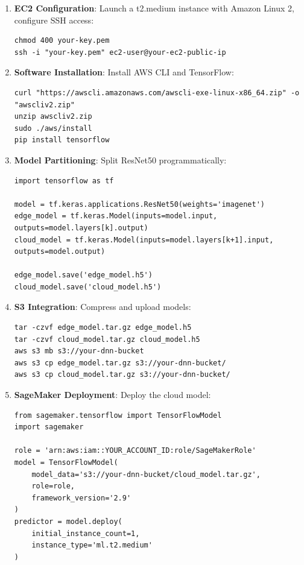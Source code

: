 \documentclass[conference]{IEEEtran}
\begin{document}
\begin{enumerate}
  \item \textbf{EC2 Configuration}: Launch a t2.medium instance with Amazon Linux 2, configure SSH access:
  \begin{lstlisting}[style=bash]
chmod 400 your-key.pem
ssh -i "your-key.pem" ec2-user@your-ec2-public-ip
  \end{lstlisting}

  \item \textbf{Software Installation}: Install AWS CLI and TensorFlow:
  \begin{lstlisting}[style=bash]
curl "https://awscli.amazonaws.com/awscli-exe-linux-x86_64.zip" -o "awscliv2.zip"
unzip awscliv2.zip
sudo ./aws/install
pip install tensorflow
  \end{lstlisting}

  \item \textbf{Model Partitioning}: Split ResNet50 programmatically:
  \begin{lstlisting}
import tensorflow as tf

model = tf.keras.applications.ResNet50(weights='imagenet')
edge_model = tf.keras.Model(inputs=model.input, outputs=model.layers[k].output)
cloud_model = tf.keras.Model(inputs=model.layers[k+1].input, outputs=model.output)

edge_model.save('edge_model.h5')
cloud_model.save('cloud_model.h5')
  \end{lstlisting}

  \item \textbf{S3 Integration}: Compress and upload models:
  \begin{lstlisting}[style=bash]
tar -czvf edge_model.tar.gz edge_model.h5
tar -czvf cloud_model.tar.gz cloud_model.h5
aws s3 mb s3://your-dnn-bucket
aws s3 cp edge_model.tar.gz s3://your-dnn-bucket/
aws s3 cp cloud_model.tar.gz s3://your-dnn-bucket/
  \end{lstlisting}

  \item \textbf{SageMaker Deployment}: Deploy the cloud model:
  \begin{lstlisting}
from sagemaker.tensorflow import TensorFlowModel
import sagemaker

role = 'arn:aws:iam::YOUR_ACCOUNT_ID:role/SageMakerRole'
model = TensorFlowModel(
    model_data='s3://your-dnn-bucket/cloud_model.tar.gz',
    role=role,
    framework_version='2.9'
)
predictor = model.deploy(
    initial_instance_count=1,
    instance_type='ml.t2.medium'
)
  \end{lstlisting}


\end{enumerate}
\end{document}
